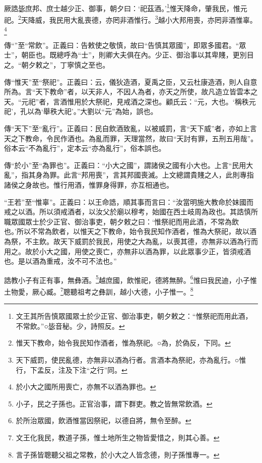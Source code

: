 厥誥毖庶邦、庶士越少正、御事，朝夕曰：‘祀茲酒。’\footnote{文王其所告慎眾國眾士於少正官、御治事吏，朝夕敕之：“惟祭祀而用此酒，不常飲。”○毖音秘。少，詩照反。}惟天降命，肇我民，惟元祀。\footnote{惟天下教命，始令我民知作酒者，惟為祭祀。○為，於偽反，下同。}天降威，我民用大亂喪德，亦罔非酒惟行。\footnote{天下威罰，使民亂德，亦無非以酒為行者。言酒本為祭祀，亦為亂行。○惟行，下孟反，注及下注“之行”同。}越小大邦用喪，亦罔非酒惟辜。\footnote{於小大之國所用喪亡，亦無不以酒為罪也。}

{\noindent\zhuan{}\fzbyks 傳“”至“常飲”。正義曰：告敕使之敬慎，故曰“告慎其眾國”，即眾多國君。“眾士”，朝臣也。既總呼為“士”，則卿大夫俱在內。少正、御治事以其卑賤，更別目之。“朝夕敕之”，丁寧慎之至也。 \par}

{\noindent\zhuan{}\fzbyks 傳“惟天”至“祭祀”。正義曰：云，儀狄造酒，夏禹之臣，又云杜康造酒，則人自意所為。言“天下教命”者，以天非人，不因人為者，亦天之所使，故凡造立皆雲本之天。“元祀”者，言酒惟用於大祭祀，見戒酒之深也。顧氏云：“元，大也。‘稱秩元祀’，孔以為‘舉秩大祀’。”大劉以“元”為始，誤也。 \par}

{\noindent\zhuan{}\fzbyks 傳“天下”至“亂行”。正義曰：民自飲酒致亂，以被威罰，言“天下威”者，亦如上言天之下教命，令民作酒也。為亂而罪，天理當然，故曰“天討有罪，五刑五用哉”。俗本云“不為亂行”，定本云“亦為亂行”，俗本誤也。 \par}

{\noindent\zhuan{}\fzbyks 傳“於小”至“為罪也”。正義曰：“小大之國”，謂諸侯之國有小大也。上言“民用大亂”，指其身為罪。此言“邦用喪”，言其邦國喪滅。上文總謂貴賤之人，此則專指諸侯之身故也。惟行用酒，惟罪身得罪，亦互相通也。 \par}

{\noindent\shu{}\fzkt “王若”至“惟辜”。正義曰：以王命誥，順其事而言曰：“汝當明施大教命於妹國而戒之以酒。所以須戒酒者，以汝父於廟以穆考，始國在西土岐周為政也。其誥慎所職眾國眾士於少正官、御治事吏，朝夕敕之曰：‘惟祭祀而用此酒，不常為飲也。’所以不常為飲者，以惟天之下教命，始令我民知作酒者，惟為大祭祀，故以酒為祭，不主飲。故天下威罰於我民，用使之大為亂，以喪其德，亦無非以酒為行而用之。故於小大之國，用使之喪亡，亦無非以酒為罪，以此眾事少正，皆須戒酒也。是以酒為重戒，汝不可不法也。” \par}

誥教小子有正有事，無彝酒。\footnote{小子，民之子孫也。正官治事，謂下群吏。教之皆無常飲酒。}越庶國，飲惟祀，德將無醉。\footnote{於所治眾國，飲酒惟當因祭祀，以德自將，無令至醉。}惟曰我民迪，小子惟土物愛，厥心臧。\footnote{文王化我民，教道子孫，惟土地所生之物皆愛惜之，則其心善。}聰聽祖考之彝訓，越小大德，小子惟一。\footnote{言子孫皆聰聽父祖之常教，於小大之人皆念德，則子孫惟專一。}


